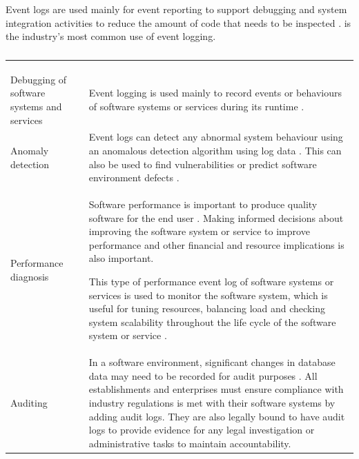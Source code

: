 Event logs are used mainly for event reporting to support debugging and system integration activities to reduce the amount of code that needs to be inspected \cite{Baccanico2014}.  is the industry's most common use of event logging.

\begin{xltabular}{\textwidth}{p{4cm}X}
	\caption[Event logs usage]
	{\textit{Event logs usage}}
	\label{tbl:ch1_eventLogsUsage} \\
	\toprule
	 &  \\
	\midrule
	\endfirsthead

	\caption[]{\continueCaption} \\
	\toprule
	 &  \\
	\midrule
	\endhead

	\midrule
	 \\ 
	\endfoot
	\endlastfoot

	\RaggedRight Debugging of software systems and services & \RaggedRight Event logging is used mainly to record events or behaviours of software systems or services during its runtime \cite{Rong2018a}. \\

	\RaggedRight Anomaly detection & \RaggedRight Event logs can detect any abnormal system behaviour using an anomalous detection algorithm using log data \cite{Gurumdimma2016}. This can also be used to find vulnerabilities or predict software environment defects \cite{Dwyer2013}. \\

	Performance diagnosis & \RaggedRight Software performance is important to produce quality software for the end user \cite{EvangelinGeetha2007, Baccanico2014}. Making informed decisions about improving the software system or service to improve performance and other financial and resource implications is also important. \par This type of performance event log of software systems or services is used to monitor the software system, which is useful for tuning resources, balancing load and checking system scalability throughout the life cycle of the software system or service \cite{Song2017}. \\
	
	Auditing & \RaggedRight In a software environment, significant changes in database data may need to be recorded for audit purposes \cite{Rong2018a}. All establishments and enterprises must ensure compliance with industry regulations is met with their software systems by adding audit logs. They are also legally bound to have audit logs to provide evidence for any legal investigation or administrative tasks to maintain accountability. \\


\end{xltabular}
